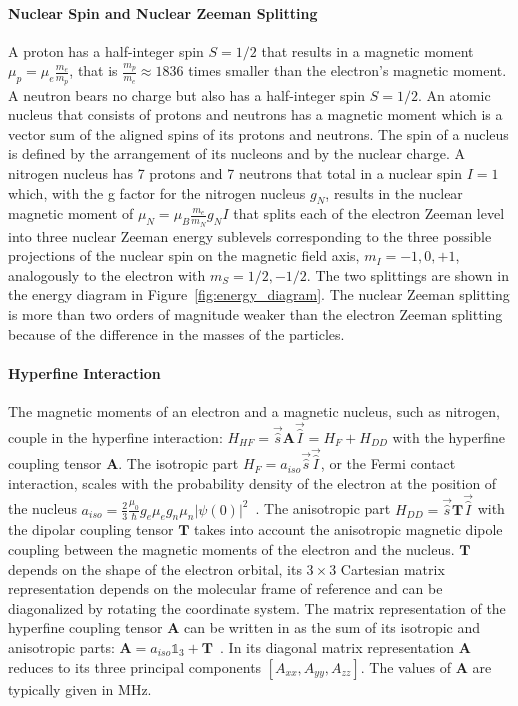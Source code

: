 \paragraph*{Nuclear Spin and Nuclear Zeeman Splitting}
A proton has a half-integer spin $S=1/2$ that results in a magnetic moment $\mu_p = \mu_e\frac{m_e}{m_p}$, that is $\frac{m_p}{m_e}\approx1836$ times smaller than the electron's magnetic moment. A neutron bears no charge but also has a half-integer spin $S=1/2$. An atomic nucleus that consists of protons and neutrons has a magnetic moment which is a vector sum of the aligned spins of its protons and neutrons. The spin of a nucleus is defined by the arrangement of its nucleons and by the nuclear charge. A nitrogen nucleus has 7 protons and 7 neutrons that total in a nuclear spin $I=1$ which, with the g factor for the nitrogen nucleus $g_N$, results in the nuclear magnetic moment of $\mu_N=\mu_B\frac{m_e}{m_N}g_NI$ that splits each of the electron Zeeman level into three nuclear Zeeman energy sublevels corresponding to the three possible projections of the nuclear spin on the magnetic field axis, $m_I=-1,0,+1$, analogously to the electron with $m_S=1/2,-1/2$. The two splittings are shown in the energy diagram in Figure~\ref{fig:energy_diagram}. The nuclear Zeeman splitting is more than two orders of magnitude weaker than the electron Zeeman splitting because of the difference in the masses of the particles.

\paragraph*{Hyperfine Interaction}
The magnetic moments of an electron and a magnetic nucleus, such as nitrogen, couple in the hyperfine interaction: $H_{HF}=\vec{\hat{s}}\textbf{A}\vec{\hat{I}}=H_F+H_{DD}$ with the hyperfine coupling tensor $\textbf{A}$. The isotropic part $H_F=a_{iso}\vec{\hat{s}}\vec{\hat{I}}$, or the Fermi contact interaction, scales with the probability density of the electron at the position of the nucleus $a_{iso}=\frac{2}{3}\frac{\mu_0}{\hbar}g_e\mu_eg_n\mu_n\vert\psi(0)\vert^2$~\cite{Schweiger2001_exch}. The anisotropic part $H_{DD}=\vec{\hat{s}}\textbf{T}\vec{\hat{I}}$ with the dipolar coupling tensor $\textbf{T}$ takes into account the anisotropic magnetic dipole coupling between the magnetic moments of the electron and the nucleus. $\textbf{T}$ depends on the shape of the electron orbital, its $3\times3$ Cartesian matrix representation depends on the molecular frame of reference and can be diagonalized by rotating the coordinate system. The matrix representation of the hyperfine coupling tensor $\textbf{A}$ can be written in as the sum of its isotropic and anisotropic parts: $\textbf{A}=a_{iso}\mathds{1}_3 + \textbf{T}$~\cite{Weil_Bolton}. In its diagonal matrix representation $\textbf{A}$ reduces to its three principal components $[A_{xx}, A_{yy}, A_{zz}]$. The values of $\textbf{A}$ are typically given in MHz.


